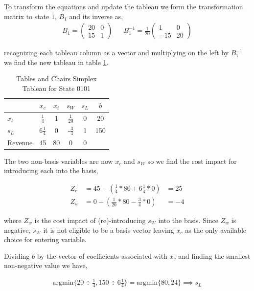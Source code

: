 To transform the equations and update the tableau we form the
transformation matrix to state $1$,  $B_1$ and its inverse as,
\begin{align*}
B_1 = \begin{pmatrix}20&0\\15&1\end{pmatrix} && B_1^{-1} = \frac{1}{20}\begin{pmatrix}1&0\\-15&20\end{pmatrix}
\end{align*}

recognizing each tableau column as a vector and multiplying on the
left by $B_1^{-1}$ we find the new tableau in table \ref{tab:tc0101}.

\begin{table}
\centering
\begin{tabular}{| l | c c c c | c |}
\hline
        & $x_c$ & $x_t$ & $s_W$ & $s_L$ & $b$\\
\hline
$x_t$   & $\frac{1}{4}$     & 1    & $\frac{1}{20}$     & 0     & 20\\
$s_L$   & 6$\frac{1}{4}$    & 0    & -$\frac{3}{4}$     & 1     & 150\\
\hline
Revenue & 45    & 80    & 0     & 0     &\\
\hline
\end{tabular}
  \caption[Tables and Chairs Simplex Tableau for State 0101]
          {Tables and Chairs Simplex Tableau for State 0101}
  \label{tab:tc0101}
\end{table}


The two non-basis variables are now $x_c$ and $s_W$ so we find the
cost impact for introducing each into the basis,

\begin{align*}
Z_c &= 45 - (\frac{1}{4}*80 + 6\frac{1}{4}*0) &= 25\\
Z_w &= 0 - (\frac{1}{20}*80 - \frac{3}{4}*0) &= -4 
\end{align*}

where $Z_w$ is the cost impact of (re)-introducing $s_W$ into the
basis. Since $Z_w$ is negative, $s_W$ it is not eligible to be a
basis vector leaving $x_c$ as the only available choice for entering
variable.

Dividing $b$ by the vector of coefficients associated with $x_c$ and
finding the smallest non-negative value we have,

\begin{align*}
\text{argmin}\{20 \div \frac{1}{4}, 150 \div 6\frac{1}{4}\} =
\text{argmin}\{80, 24\} \implies s_L
\end{align*}

